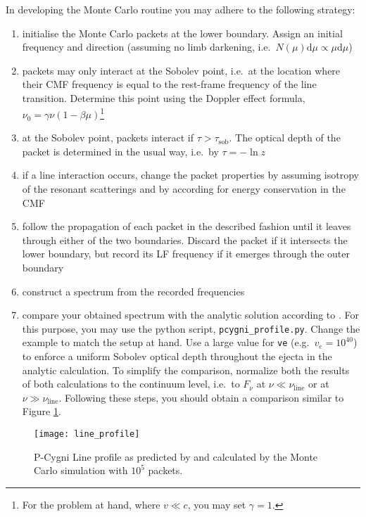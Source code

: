 \documentclass[12pt,a4paper,twoside]{article}
\begin{document}
\begin{enumerate}
  In developing the Monte Carlo routine you may adhere to the following
  strategy:
  \begin{enumerate}
    \item initialise the Monte Carlo packets at the lower boundary. Assign an
      initial frequency and direction (assuming no limb darkening, i.e.\ $N(\mu)
      \mathrm{d} \mu \propto \mu \mathrm{d}\mu$)
    \item packets may only interact at the Sobolev point, i.e.\ at the location
      where their CMF frequency is equal to the rest-frame frequency of the line
      transition. Determine this point using the Doppler effect formula, $\nu_0 =
      \gamma \nu (1 - \beta \mu)$\footnote{For the problem at hand, where $v \ll
      c$, you may set $\gamma = 1$.}
    \item at the Sobolev point, packets interact if $\tau >
      \tau_{\mathrm{sob}}$. The optical depth of the packet is determined in the
      usual way, i.e.\ by $\tau = - \ln z$
    \item if a line interaction occurs, change the packet properties by assuming
      isotropy of the resonant scatterings and by according for 
      energy conservation in the CMF 
    \item follow the propagation of each packet in the described fashion until
      it leaves through either of the two boundaries. Discard the packet if it
      intersects the lower boundary, but record its LF frequency if it emerges
      through the outer boundary
    \item construct a spectrum from the recorded frequencies

    \item compare your obtained spectrum with the analytic solution according to
      \citet{Jeffery1990}. For this purpose, you may use the python script,
      \texttt{pcygni\_profile.py}. Change the example to match the setup at hand.
      Use a large value for \texttt{ve} (e.g.\ $v_e = 10^{40}$) to enforce a uniform
      Sobolev optical depth throughout the ejecta in
      the analytic calculation. To simplify the comparison, normalize both the
      results of both calculations to the continuum level, i.e.\ to
      $F_{\nu}$ at $\nu \ll \nu_{\mathrm{line}}$ or at $\nu \gg
      \nu_{\mathrm{line}}$. Following these steps, you should obtain a
      comparison similar to Figure \ref{fig:profile}.
  \end{enumerate}
\end{enumerate}

  \begin{figure}[h]
    \centering
    \texttt{[image: line\_profile]}
    \caption{P-Cygni Line profile as predicted by \citet{Jeffrey1990} and
    calculated by the Monte Carlo simulation with $10^5$ packets.}
    \label{fig:profile}
  \end{figure}



\end{document}
